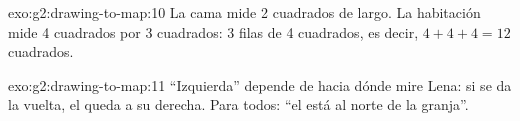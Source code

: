 \begin{solution}{exo:g2:drawing-to-map:10}
La cama mide 2 cuadrados de largo. La habitación mide 4 cuadrados por
3 cuadrados: 3 filas de 4 cuadrados, es decir, $4 + 4 + 4 = 12$ cuadrados.
\end{solution}

\begin{solution}{exo:g2:drawing-to-map:11}
``Izquierda'' depende de hacia dónde mire Lena: si se da la vuelta, el 
queda a su derecha. Para todos: ``el  está al norte de la granja''.
\end{solution}
